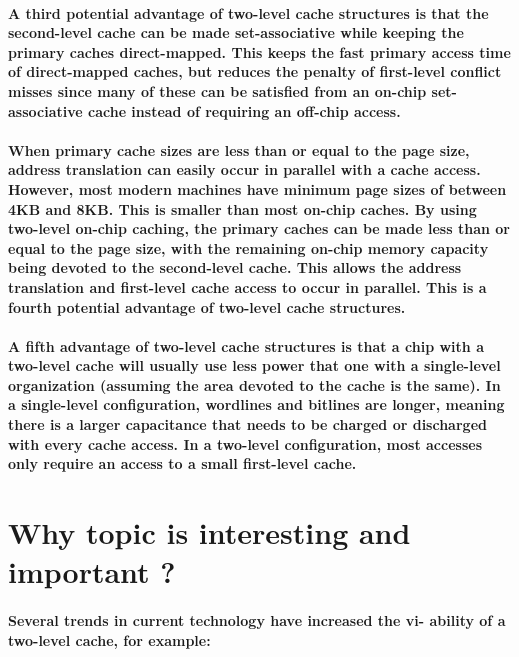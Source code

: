 \documentclass{article}
\begin{document}
\paragraph{A third potential advantage of two-level cache structures is that the second-level cache can be
made set-associative while keeping the primary caches direct-mapped. This keeps the fast
primary access time of direct-mapped caches, but reduces the penalty of first-level conflict
misses since many of these can be satisfied from an on-chip set-associative cache instead of
requiring an off-chip access.}

\paragraph{When primary cache sizes are less than or equal to the page size, address translation can easily
occur in parallel with a cache access. However, most modern machines have minimum page
sizes of between 4KB and 8KB. This is smaller than most on-chip caches. By using two-level
on-chip caching, the primary caches can be made less than or equal to the page size, with the
remaining on-chip memory capacity being devoted to the second-level cache. This allows the
address translation and first-level cache access to occur in parallel. This is a fourth potential advantage of 
two-level cache structures.}

\paragraph{A fifth advantage of two-level cache structures is that a chip with a two-level cache will
usually use less power that one with a single-level organization (assuming the area devoted to the
cache is the same). In a single-level configuration, wordlines and bitlines are longer, meaning
there is a larger capacitance that needs to be charged or discharged with every cache access. In a
two-level configuration, most accesses only require an access to a small first-level cache.}


\section{Why topic is interesting and important ?}

\paragraph{Several trends in current technology have increased the vi-
ability of a two-level cache, for example:}
\end{document}
